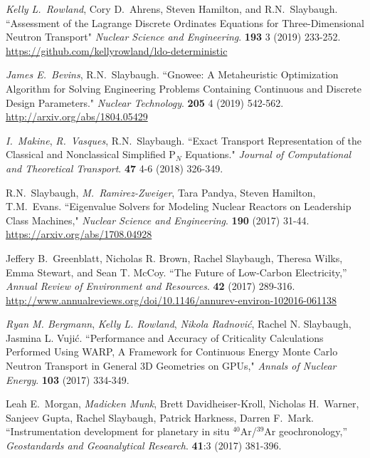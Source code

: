 \begin{bibsection}
\item \textit{Kelly L.\ Rowland}, Cory D.\ Ahrens, Steven Hamilton, and R.N.\ Slaybaugh. ``Assessment of the Lagrange Discrete Ordinates Equations for Three-Dimensional Neutron Transport"  \textit{Nuclear Science and Engineering}. \textbf{193} 3 (2019) 233-252.\\
\url{https://github.com/kellyrowland/ldo-deterministic}

\item \textit{James E.\ Bevins}, R.N.\ Slaybaugh. ``Gnowee: A Metaheuristic Optimization Algorithm for Solving Engineering Problems Containing Continuous and Discrete Design Parameters." \textit{Nuclear Technology}. \textbf{205} 4 (2019) 542-562.\\
\url{http://arxiv.org/abs/1804.05429}

\item \textit{I.\ Makine}, \textit{R.\ Vasques}, R.N.\ Slaybaugh. ``Exact Transport Representation of the Classical and Nonclassical Simplified P$_N$ Equations." \textit{Journal of Computational and Theoretical Transport}. \textbf{47} 4-6 (2018) 326-349.

\item R.N.\ Slaybaugh, \textit{M.\ Ramirez-Zweiger}, Tara Pandya, Steven Hamilton, T.M.\ Evans. ``Eigenvalue Solvers for Modeling Nuclear Reactors on Leadership Class Machines," \textit{Nuclear Science and Engineering}. \textbf{190} (2017) 31-44.\\
\url{https://arxiv.org/abs/1708.04928}

\item Jeffery B.\ Greenblatt, Nicholas R. Brown, Rachel Slaybaugh, Theresa Wilks, Emma Stewart, and Sean T. McCoy. ``The Future of Low-Carbon Electricity,'' \textit{Annual Review of Environment and Resources}. \textbf{42} (2017) 289-316. \\
\url{http://www.annualreviews.org/doi/10.1146/annurev-environ-102016-061138}

\item \textit{Ryan M. Bergmann}, \textit{Kelly L. Rowland}, \textit{Nikola Radnovi\'c}, Rachel N. Slaybaugh, Jasmina L. Vuji\'c. ``Performance and Accuracy of Criticality Calculations Performed Using WARP, A Framework for Continuous Energy Monte Carlo Neutron Transport in General 3D Geometries on GPUs," \textit{Annals of Nuclear Energy}. \textbf{103} (2017) 334-349.

\item Leah E.\ Morgan, \textit{Madicken Munk}, Brett Davidheiser-Kroll, Nicholas H.\ Warner, Sanjeev Gupta, Rachel Slaybaugh, Patrick Harkness, Darren F.\ Mark. ``Instrumentation development for planetary in situ $^{40}$Ar/$^{39}$Ar geochronology,'' \textit{Geostandards and Geoanalytical Research}. \textbf{41}:3 (2017) 381-396.


\end{bibsection}
